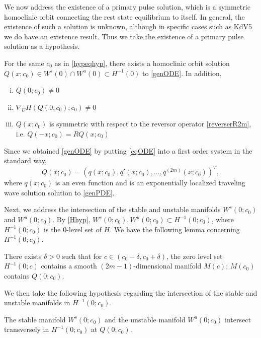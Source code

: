 \documentclass[thesis.tex]{subfiles}
\begin{document}
We now address the existence of a primary pulse solution, which is a symmetric homoclinic orbit connecting the rest state equilibrium to itself. In general, the existence of such a solution is unknown, although in specific cases such as KdV5 we do have an existence result. Thus we take the existence of a primary pulse solution as a hypothesis.

\begin{hypothesis}\label{Qexistshyp}
For the same $c_0$ as in \cref{hypeqhyp}, there exists a homoclinic orbit solution $Q(x; c_0) \in W^s(0) \cap W^u(0) \subset H^{-1}(0)$ to \cref{genODE}. In addition,
\begin{enumerate}[(i)]
\item $Q(0; c_0) \neq 0$
\item $\nabla_U H(Q(0; c_0); c_0) \neq 0$
\item $Q(x; c_0)$ is symmetric with respect to the reversor operator \cref{reverserR2m}, i.e. $Q(-x; c_0) = R Q(x; c_0)$
\end{enumerate}
\end{hypothesis}

Since we obtained \cref{genODE} by putting \cref{eqODE} into a first order system in the standard way, 
\begin{equation}\label{Qqrelation}
Q(x; c_0) = (q(x; c_0), q'(x; c_0), \dots, q^{(2m)}(x; c_0))^T,
\end{equation}
where $q(x; c_0)$ is an even function and is an exponentially localized traveling wave solution solution to \cref{genPDE}. 

Next, we address the intersection of the stable and unstable manifolds $W^s(0; c_0)$ and $W^u(0; c_0)$. By \cref{Hhyp}, $W^s(0; c_0), W^u(0; c_0) \subset H^{-1}(0; c_0)$, where $H^{-1}(0; c_0)$ is the 0-level set of $H$. We have the following lemma concerning $H^{-1}(0; c_0)$.

\begin{lemma}\label{manifoldinH0}
There exists $\delta > 0$ such that for $c \in (c_0 - \delta, c_0 + \delta)$, the zero level set $H^{-1}(0; c)$ contains a smooth $(2m-1)$-dimensional manifold $M(c)$; $M(c_0)$ contains $Q(0; c_0)$.
\end{lemma}

We then take the following hypothesis regarding the intersection of the stable and unstable manifolds in $H^{-1}(0; c_0)$.

\begin{hypothesis}\label{H0transversehyp}
The stable manifold $W^s(0; c_0)$ and the unstable manifold $W^u(0; c_0)$ intersect transversely in $H^{-1}(0; c_0)$ at $Q(0; c_0)$.
\end{hypothesis}
\end{document}

